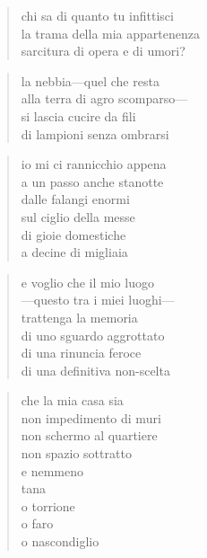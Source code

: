 \begin{verse}
    chi sa di quanto tu infittisci\\
    la trama della mia appartenenza\\
    sarcitura di opera e di umori?
\end{verse}

\clearpage


\begin{verse}
    la nebbia—quel che resta\\
    alla terra di agro scomparso—\\
    si lascia cucire da fili\\
    di lampioni senza ombrarsi
\end{verse}

\begin{verse}
    io mi ci rannicchio appena\\
    a un passo anche stanotte\\
    dalle falangi enormi\\
    sul ciglio della messe\\
    di gioie domestiche\\
    a decine di migliaia
\end{verse}

\begin{verse}
    e voglio che il mio luogo\\
    —questo tra i miei luoghi—\\
    trattenga la memoria\\
    di uno sguardo aggrottato\\
    di una rinuncia feroce\\
    di una definitiva non-scelta
\end{verse}

\clearpage


\begin{verse}
    che la mia casa sia\\
    non impedimento di muri\\
    non schermo al quartiere\\
    non spazio sottratto\\
    e nemmeno\\
    tana\\
    o torrione\\
    o faro\\
    o nascondiglio
\end{verse}

